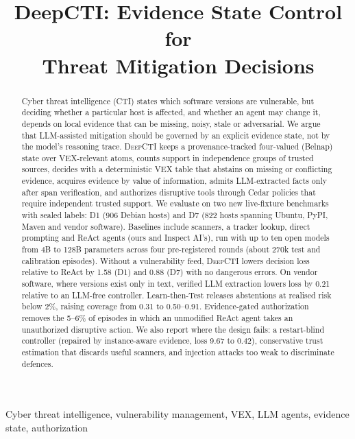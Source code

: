 \documentclass[conference]{IEEEtran}
\newcommand{\DC}{\textsc{DeepCTI}}
\begin{document}
\title{DeepCTI: Evidence State Control for\\Threat Mitigation Decisions}

\author{
}

\maketitle

\begin{abstract}
Cyber threat intelligence (CTI) states which software versions are vulnerable, but deciding whether a
particular host is affected, and whether an agent may change it, depends on local evidence that can be
missing, noisy, stale or adversarial. We argue that LLM-assisted mitigation should be governed by an
explicit evidence state, not by the model's reasoning trace. \DC{} keeps a provenance-tracked
four-valued (Belnap) state over VEX-relevant atoms, counts support in independence groups of trusted
sources, decides with a deterministic VEX table that abstains on missing or conflicting evidence,
acquires evidence by value of information, admits LLM-extracted facts only after span verification, and
authorizes disruptive tools through Cedar policies that require independent trusted support. We
evaluate on two new live-fixture benchmarks with sealed labels: D1 (906 Debian hosts) and D7 (822 hosts
spanning Ubuntu, PyPI, Maven and vendor software). Baselines include scanners, a tracker lookup, direct
prompting and ReAct agents (ours and Inspect AI's), run with up to ten open models from 4B to 128B parameters
across four pre-registered rounds (about 270k test and calibration episodes). Without a vulnerability feed, \DC{} lowers
decision loss relative to ReAct by 1.58 (D1) and 0.88 (D7) with no dangerous errors. On vendor software,
where versions exist only in text, verified LLM extraction lowers loss by 0.21 relative to an LLM-free
controller. Learn-then-Test
releases abstentions at realised risk below 2\%, raising coverage from 0.31 to 0.50--0.91.
Evidence-gated authorization removes the 5--6\% of episodes in which an unmodified ReAct agent takes an
unauthorized disruptive action. We also report where the design fails: a restart-blind controller
(repaired by instance-aware evidence, loss 9.67 to 0.42), conservative trust estimation that discards
useful scanners, and injection attacks too weak to discriminate defences.
\end{abstract}

\begin{IEEEkeywords}
Cyber threat intelligence, vulnerability management, VEX, LLM agents, evidence state, authorization
\end{IEEEkeywords}
\end{document}
